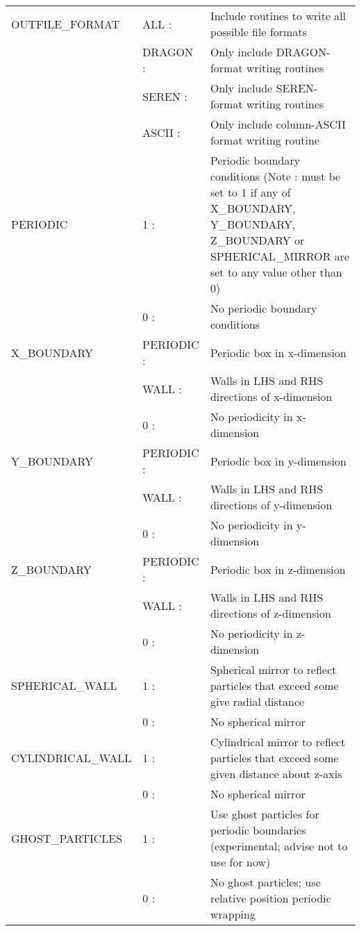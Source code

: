 \documentclass[a4paper]{article}
\begin{document}
\begin{center}
\begin{supertabular}{|p{4.6cm}|p{4.6cm} p{6.4cm}|}
 OUTFILE\_FORMAT & ALL       :& Include routines to write all possible file formats \\
                 & DRAGON    :& Only include DRAGON-format writing routines \\
                 & SEREN     :& Only include SEREN-format writing routines \\ 
                 & ASCII     :& Only include column-ASCII format writing routine \\ \hline

 PERIODIC      & 1 :& Periodic boundary conditions (Note : must be set to 1 if any of X\_BOUNDARY, Y\_BOUNDARY, Z\_BOUNDARY or SPHERICAL\_MIRROR are set to any value other than 0) \\
               & 0 :& No periodic boundary conditions \\ \hline

 X\_BOUNDARY   & PERIODIC :& Periodic box in x-dimension  \\
               & WALL     :& Walls in LHS and RHS directions of x-dimension \\
               & 0        :& No periodicity in x-dimension \\ \hline

 Y\_BOUNDARY   & PERIODIC :& Periodic box in y-dimension \\
               & WALL     :& Walls in LHS and RHS directions of y-dimension \\
               & 0        :& No periodicity in y-dimension \\ \hline

 Z\_BOUNDARY   & PERIODIC :& Periodic box in z-dimension \\
               & WALL     :& Walls in LHS and RHS directions of z-dimension \\
               & 0        :& No periodicity in z-dimension \\ \hline

 SPHERICAL\_WALL & 1 :& Spherical mirror to reflect particles that exceed some give radial distance \\
                   & 0 :& No spherical mirror \\ \hline

 CYLINDRICAL\_WALL & 1 :& Cylindrical mirror to reflect particles that exceed some given distance about z-axis \\
                   & 0 :& No spherical mirror \\ \hline

 GHOST\_PARTICLES       & 1 :& Use ghost particles for periodic boundaries (experimental; advise not to use for now) \\
                        & 0 :& No ghost particles; use relative position periodic wrapping \\ \hline


\end{supertabular}
\end{center}
\end{document}
